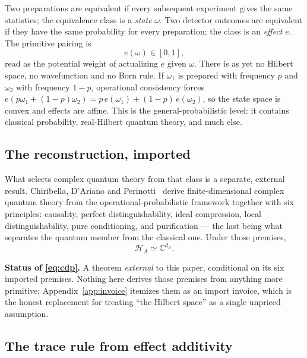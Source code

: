 \documentclass[11pt,a4paper]{article}
\theoremstyle{definition}
\theoremstyle{plain}
\theoremstyle{remark}
\begin{document}
Two preparations are equivalent if every subsequent experiment gives the
same statistics; the equivalence class is a \emph{state} $\omega$. Two
detector outcomes are equivalent if they have the same probability for
every preparation; the class is an \emph{effect} $e$. The primitive
pairing is
\begin{equation}
e(\omega) \in [0,1],
\end{equation}
read as the potential weight of actualizing $e$ given $\omega$. There is
as yet no Hilbert space, no wavefunction and no Born rule. If $\omega_1$
is prepared with frequency $p$ and $\omega_2$ with frequency $1-p$,
operational consistency forces
$e(p\omega_1 + (1-p)\omega_2) = p\,e(\omega_1) + (1-p)\,e(\omega_2)$, so
the state space is convex and effects are affine. This is the
general-probabilistic level: it contains classical probability,
real-Hilbert quantum theory, and much else.

\subsection{The reconstruction, imported}

What selects complex quantum theory from that class is a separate,
external result. Chiribella, D'Ariano and Perinotti~\cite{cdp} derive
finite-dimensional complex quantum theory from the
operational-probabilistic framework together with six principles:
causality, perfect distinguishability, ideal compression, local
distinguishability, pure conditioning, and purification --- the last
being what separates the quantum member from the classical one. Under
those premises,
\begin{equation}
\mathcal{H}_A \simeq \mathbb{C}^{d_A}.
\label{eq:cdp}
\end{equation}

\begin{scopebox}
\textbf{Status of \eqref{eq:cdp}.} A theorem \emph{external} to this
paper, conditional on its six imported premises. Nothing here derives
those premises from anything more primitive; Appendix~\ref{app:invoice}
itemizes them as an import invoice, which is the honest replacement for
treating ``the Hilbert space'' as a single unpriced assumption.
\end{scopebox}

\subsection{The trace rule from effect additivity}
\end{document}
